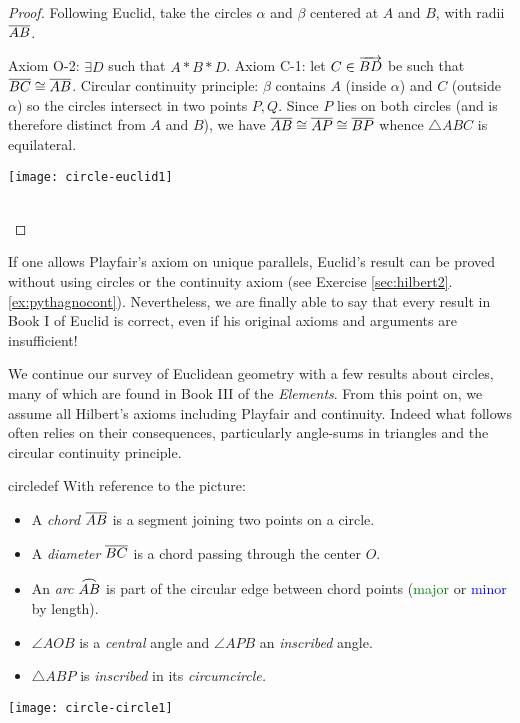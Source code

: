 \begin{proof}
	Following Euclid, take the circles $\alpha$ and $\beta$ centered at $A$ and $B$, with radii $\overline{AB}$.\par
	\begin{minipage}[t]{0.58\linewidth}\vspace{-5pt}
		Axiom O-2: $\exists D$ such that $A*B*D$.\smallbreak
		Axiom C-1: let $C\in\overrightarrow{BD}$ be such that $\overline{BC}\cong\overline{AB}$.\smallbreak
		Circular continuity principle: $\beta$ contains $A$ (inside $\alpha$) and $C$ (outside $\alpha$) so the circles intersect in two points $P,Q$.\smallbreak
		Since $P$ lies on both circles (and is therefore distinct from $A$ and $B$), we have $\overline{AB}\cong\overline{AP}\cong\overline{BP}$ whence $\triangle ABC$ is equilateral.
	\end{minipage}
	\hfill
	\begin{minipage}[t]{0.41\linewidth}\vspace{-5pt}
		\flushright
		\texttt{[image: circle-euclid1]}
	\end{minipage}\\[-5pt]
\end{proof}

If one allows Playfair's axiom on unique parallels, Euclid's result can be proved without using circles or the continuity axiom (see Exercise \ref*{sec:hilbert2}.\ref{ex:pythagnocont}). Nevertheless, we are finally able to say that every result in Book I of Euclid is correct, even if his original axioms and arguments are insufficient!




We continue our survey of Euclidean geometry with a few results about circles, many of which are found in Book III of the \emph{Elements}. From this point on, we assume all Hilbert's axioms including Playfair and continuity. Indeed what follows often relies on their consequences, particularly angle-sums in triangles and the circular continuity principle.

\begin{defn}[lower separated=false, sidebyside, sidebyside align=top seam, sidebyside gap=0pt, righthand width=0.35\linewidth]{}{circledef}
	With reference to the picture:
	\begin{itemize}\itemsep0pt
	  \item A \emph{chord} $\overline{AB}$ is a segment joining two points on a circle.
	  \item A \emph{diameter} $\overline{BC}$ is a chord passing through the center $O$.
	  \item An \emph{arc} $\arc{AB}$ is part of the circular edge between chord points (\textcolor{Green}{major} or \textcolor{blue}{minor} by length).
	  \item $\angle AOB$ is a \emph{central} angle and $\angle APB$ an \emph{inscribed} angle.
	  \item $\triangle ABP$ is \emph{inscribed} in its \emph{circumcircle.}
	\end{itemize}
	\tcblower
	\flushright
	\texttt{[image: circle-circle1]}
\end{defn}

